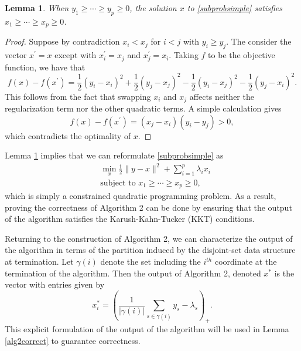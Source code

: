 \documentclass{uwstat572}
\newtheorem{lemma}[theorem]{Lemma}
\theoremstyle{remark}
\theoremstyle{definition}
\begin{document}
\begin{lemma}\label{ordering}
When $y_1 \geq \cdots \geq y_p \geq 0$, the solution $x$ to \eqref{subprobsimple} satisfies $x_1 \geq \cdots \geq x_p \geq 0$.
\end{lemma}
\begin{proof}
Suppose by contradiction $x_i < x_j$ for $i < j$ with $y_i \geq y_j$.  The consider the vector $x^{\prime} = x$ except with $x^{\prime}_i = x_j$ and $x^{\prime}_j = x_i$.  Taking $f$ to be the objective function, we have that
\begin{equation*}
f(x) - f(x^{\prime}) = \frac{1}{2}(y_i - x_i)^2 + \frac{1}{2} (y_j - x_j)^2 - \frac{1}{2}(y_i - x_j)^2 - \frac{1}{2} (y_j - x_i)^2.
\end{equation*}
This follows from the fact that swapping $x_i$ and $x_j$ affects neither the regularization term nor the other quadratic terms.  A simple calculation gives
\begin{equation*}
    f(x) - f(x^{\prime}) = (x_j - x_i)(y_i - y_j) > 0,
\end{equation*}
which contradicts the optimality of $x$. 
\end{proof}
Lemma \ref{ordering} implies that we can reformulate \eqref{subprobsimple} as 
\begin{equation}\label{constrained}
\begin{aligned}
& \min_{x} \frac{1}{2} \|y-x\|^2 + \sum_{i=1}^p \lambda_i x_i 
\\
& {\text{subject to }} x_1 \geq \cdots \geq x_p \geq 0,
\end{aligned}
\end{equation}
which is simply a constrained quadratic programming problem.  As a result, proving the correctness of Algorithm 2 can be done by ensuring that the output of the algorithm satisfies the Karush-Kahn-Tucker (KKT) conditions.

Returning to the construction of Algorithm 2, we can characterize the output of the algorithm in terms of the partition induced by the disjoint-set data structure at termination. Let $\gamma(i)$ denote the set including the $i^{th}$ coordinate at the termination of the algorithm. Then the output of Algorithm 2, denoted $x^*$ is the vector with entries given by
\begin{equation}\label{algout}
    x_i^* =  \left( \frac{1}{|\gamma(i)|} \sum_{s \in \gamma(i)} y_s - \lambda_s \right)_+.
\end{equation}
This explicit formulation of the output of the algorithm will be used in Lemma \ref{alg2correct} to guarantee correctness.
\end{document}
